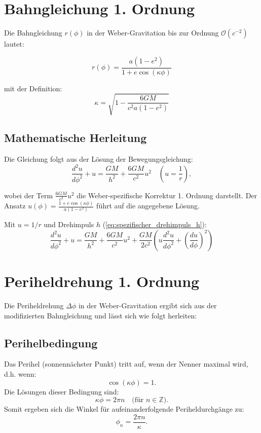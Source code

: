 \newpage
\section{Bahngleichung 1. Ordnung}
Die Bahngleichung \(r(\phi)\) in der Weber-Gravitation bis zur Ordnung \(\mathcal{O}(c^{-2})\) lautet:

\begin{equation}
\label{eq:bahngleichung_1_ordnung}
r(\phi) = \frac{a(1 - e^2)}{1 + e \cos\left(\kappa\phi\right)}
\end{equation}

\noindent mit der Definition:
\begin{equation}
\label{eq:kappa_1_ordnung}
\kappa = \sqrt{1 - \frac{6GM}{c^2a(1 - e^2)}}
\end{equation}

\subsection*{Mathematische Herleitung}
Die Gleichung folgt aus der Lösung der Bewegungsgleichung:
\begin{equation}
\frac{d^2u}{d\phi^2} + u = \frac{GM}{h^2} + \frac{6GM}{c^2} u^2 \quad \left(u = \frac{1}{r}\right),
\end{equation}

wobei der Term \(\frac{6GM}{c^2} u^2\) die Weber-spezifische Korrektur 1. Ordnung darstellt. Der Ansatz \(u(\phi) = \frac{1 + e \cos(\kappa\phi)}{a(1 - e^2)}\) führt auf die angegebene Lösung.

Mit $u=1/r$ und Drehimpuls $h$ (\ref{eq:spezifischer_drehimpuls_h}):
\begin{equation}
\frac{d^2u}{d\phi^2} + u = \frac{GM}{h^2} + \frac{6GM}{c^2}u^2 + \frac{GM}{2c^2}\left(u\frac{d^2u}{d\phi^2} + \left(\frac{du}{d\phi}\right)^2\right)
\end{equation}

\section{Periheldrehung 1. Ordnung}
Die Periheldrehung $\Delta\phi$ in der Weber-Gravitation ergibt sich aus der modifizierten Bahngleichung und lässt sich wie folgt herleiten:

\subsection{Perihelbedingung}
Das Perihel (sonnennächster Punkt) tritt auf, wenn der Nenner maximal wird, d.h. wenn:
\begin{equation}
\cos(\kappa\phi) = 1.
\end{equation}
Die Lösungen dieser Bedingung sind:
\begin{equation}
\kappa\phi = 2\pi n \quad \text{(für $n \in \mathbb{Z}$)}.
\end{equation}
Somit ergeben sich die Winkel für aufeinanderfolgende Periheldurchgänge zu:
\begin{equation}
\phi_n = \frac{2\pi n}{\kappa}.
\end{equation}

